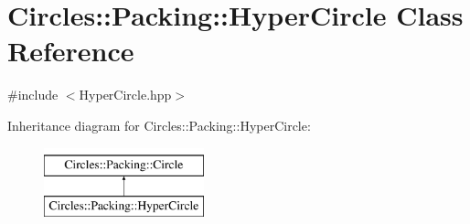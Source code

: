 \hypertarget{class_circles_1_1_packing_1_1_hyper_circle}{}\section{Circles\+:\+:Packing\+:\+:Hyper\+Circle Class Reference}
\label{class_circles_1_1_packing_1_1_hyper_circle}


{\ttfamily \#include $<$Hyper\+Circle.\+hpp$>$}

Inheritance diagram for Circles\+:\+:Packing\+:\+:Hyper\+Circle\+:\begin{figure}[H]
\begin{center}
\leavevmode
\includegraphics[height=2.000000cm]{class_circles_1_1_packing_1_1_hyper_circle}
\end{center}
\end{figure}
